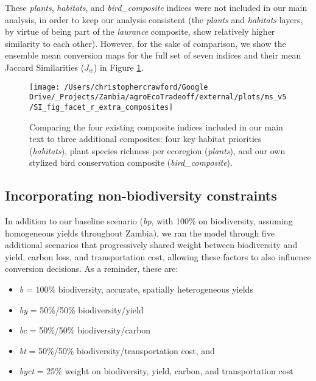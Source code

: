 \documentclass[
]{article}
\providecommand{\tightlist}{%
  \setlength{\itemsep}{0pt}\setlength{\parskip}{0pt}}
\begin{document}
These \emph{plants}, \emph{habitats}, and \emph{bird\_composite} indices were not included in our main analysis, in order to keep our analysis consistent (the \emph{plants} and \emph{habitats} layers, by virtue of being part of the \emph{laurance} composite, show relatively higher similarity to each other). However, for the sake of comparison, we show the ensemble mean conversion maps for the full set of seven indices and their mean Jaccard Similarities (\(J_w\)) in Figure \ref{fig:all-composites}.



\begin{figure}
\texttt{[image: /Users/christophercrawford/Google Drive/\_Projects/Zambia/agroEcoTradeoff/external/plots/ms\_v5/SI\_fig\_facet\_r\_extra\_composites]} \caption{Comparing the four existing composite indices included in our main text to three additional composites: four key habitat priorities (\emph{habitats}), plant species richness per ecoregion (\emph{plants}), and our own stylized bird conservation composite (\emph{bird\_composite}).}\label{fig:all-composites}
\end{figure}

\newpage

\hypertarget{weights-results}{%
\subsection{Incorporating non-biodiversity constraints}\label{weights-results}}

In addition to our baseline scenario (\emph{bp}, with 100\% on biodiversity, assuming homogeneous yields throughout Zambia), we ran the model through five additional scenarios that progressively shared weight between biodiversity and yield, carbon loss, and transportation cost, allowing these factors to also influence conversion decisions. As a reminder, these are:

\begin{itemize}
\tightlist
\item
  \emph{b} = 100\% biodiversity, accurate, spatially heterogeneous yields
\item
  \emph{by} = 50\%/50\% biodiversity/yield
\item
  \emph{bc} = 50\%/50\% biodiversity/carbon
\item
  \emph{bt} = 50\%/50\% biodiversity/transportation cost, and
\item
  \emph{byct} = 25\% weight on biodiversity, yield, carbon, and transportation cost
\end{itemize}
\end{document}
